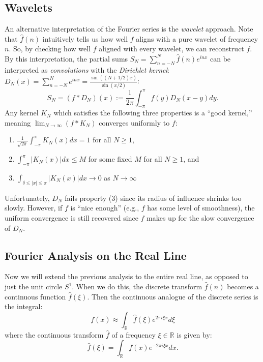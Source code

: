 \documentclass[12pt]{article}
\begin{document}
\subsection*{Wavelets}

An alternative interpretation of the Fourier series is the {\it wavelet}
approach.
Note that $\hat{f}(n)$ intuitively tells us how well $f$ aligns with a pure 
wavelet of frequency $n$.
So, by checking how well $f$ aligned with every wavelet, we can reconstruct $f$.
By this interpretation, the partial sums
$S_N = \sum_{n=-N}^N\hat{f}(n)e^{inx}$ can be interpreted as {\it convolutions}
with the {\it Dirichlet kernel}: 
$D_N(x) = \sum_{n=-N}^N e^{inx} = \frac{\sin\left((N+1/2)x\right)}{\sin(x/2)}$:
$$
S_N = (f * D_N)(x) := \frac{1}{2\pi}\int_{-\pi}^\pi f(y) D_N(x-y) dy.
$$
Any kernel $K_N$ which satisfies the following three properties
is a ``good kernel,'' meaning  
$\lim_{N\rightarrow\infty} (f * K_N)$ converges uniformly to $f$:
\begin{enumerate}
\item $\frac{1}{\sqrt{2\pi}} \int_{-\pi}^\pi K_N(x) dx = 1$ for all $N\geq 1$,
\item $\int_{-\pi}^\pi|K_N(x)|dx \leq M$ for some fixed $M$ for all $N\geq 1$,
and
\item 
$\int_{\delta\leq|x|\leq\pi}|K_N(x)|dx \rightarrow 0$ as $N\rightarrow\infty$
\end{enumerate}

Unfortunately, $D_N$ fails property (3) since its radius of influence shrinks
too slowly.
However, if $f$ is ``nice enough'' (e.g., $f$ has some level of 
smoothness), the uniform convergence is still recovered since $f$ makes up
for the slow convergence of $D_N$.

\subsection*{Fourier Analysis on the Real Line}

Now we will extend the previous analysis to the entire real line, as opposed
to just the unit circle $S^1$.
When we do this, the discrete transform $\hat{f}(n)$ becomes a continuous
function $\hat{f}(\xi)$.
Then the continuous analogue of the discrete series is the integral:
$$
f(x) \approx \int_\mathbb{R} \hat{f}(\xi)e^{2\pi i\xi x} d\xi
$$
where the continuous transform $\hat{f}$ of a frequency $\xi\in\mathbb{R}$ is 
given by:
$$
\hat{f}(\xi) = \int_\mathbb{R} f(x)e^{-2\pi i\xi x} dx.
$$
\end{document}
